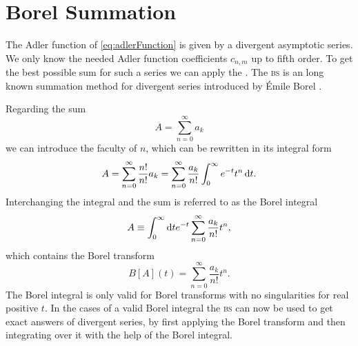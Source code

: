 \documentclass[../../index.tex]{subfiles}
\begin{document}
\section{Borel Summation}
The Adler function of \cref{eq:adlerFunction} is given by a divergent asymptotic series.
We only know the needed Adler function coefficients \(c_{n,m}\) up to fifth
order. To get the best possible sum for such a series we can apply the
. The \textsc{bs} is an long known summation method
for divergent series introduced by Émile Borel \cite{Emile1899}.

Regarding the sum
\begin{equation}
  A = \sum_{n=0}^{\infty} a_k
\end{equation}
we can introduce the faculty of \(n\), which can be rewritten in its integral
form
\begin{equation}
  A = \sum_{n=0}^\infty \frac{n!}{n!} a_k = \sum_{n=0}^{\infty} \frac{a_k}{n!} \int_0^\infty e^{-t} t^n \dif t.
\end{equation}
Interchanging the integral and the sum is referred to as the Borel integral
\begin{equation}
  A \equiv \int_0^\infty \dif t e^{-t} \sum_{n=0}^\infty \frac{a_k}{n!} t^n,
  \label{eq:borelSum}
\end{equation}
which contains the Borel transform
\begin{equation}
  B[A](t) = \sum_{n=0}^\infty \frac{a_k}{n!} t^n.
\end{equation}
The Borel integral is only valid for Borel transforms with no singularities
for real positive \(t\). In the cases of a valid Borel integral the
\textsc{bs} can now be used to get exact answers of divergent series, by first
applying the Borel transform and then integrating over it with the help of the
Borel integral.
\end{document}
